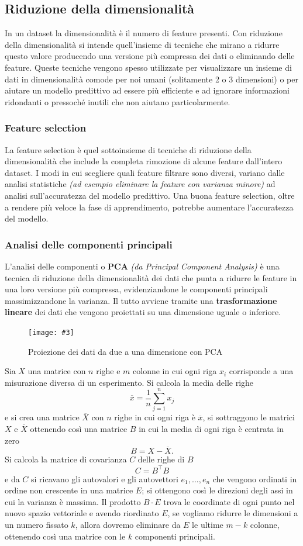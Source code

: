 \documentclass[12pt, twoside, letterpaper]{report}
\newcommand{\img}[4] {
	\begin{figure}
		\centering
		\texttt{[image: \#3]}\\
		\caption{#1}
		\label{#4}
	\end{figure}
}
\begin{document}
			\subsection{Riduzione della dimensionalità} In un dataset la dimensionalità è il numero di feature presenti. Con riduzione della dimensionalità si intende quell'insieme di tecniche che mirano a ridurre questo valore producendo una versione più compressa dei dati o eliminando delle feature. Queste tecniche vengono spesso utilizzate per visualizzare un insieme di dati in dimensionalità comode per noi umani (solitamente 2 o 3 dimensioni) o per aiutare un modello predittivo ad essere più efficiente e ad ignorare informazioni ridondanti o pressoché inutili che non aiutano particolarmente. 
			
				\subsubsection{Feature selection} La feature selection è quel sottoinsieme di tecniche di riduzione della dimensionalità che include la completa rimozione di alcune feature dall'intero dataset. I modi in cui scegliere quali feature filtrare sono diversi, variano dalle analisi statistiche \textit{(ad esempio eliminare la feature con varianza minore)} ad analisi sull'accuratezza del modello predittivo. Una buona feature selection, oltre a rendere più veloce la fase di apprendimento, potrebbe aumentare l'accuratezza del modello.
				
				\subsubsection{Analisi delle componenti principali} L'analisi delle componenti o \textbf{PCA} \textit{(da Principal Component Analysis)} è una tecnica di riduzione della dimensionalità dei dati che punta a ridurre le feature in una loro versione più compressa, evidenziandone le componenti principali massimizzandone la varianza. Il tutto avviene tramite una \textbf{trasformazione lineare} dei dati che vengono proiettati su una dimensione uguale o inferiore.
				\img{Proiezione dei dati da due a una dimensione con PCA \cite{bitsofdna}}{0.3}{pca.jpg}{pca}
				Sia $X$ una matrice con $n$ righe e $m$ colonne in cui ogni riga $x_i$ corrisponde a una misurazione diversa di un esperimento.  Si calcola la media delle righe 
				$$\overline{x}= \frac{1}{n} \sum_{j=1}^n x_j$$ 
				e si crea una matrice $\overline{X}$ con $n$ righe in cui ogni riga è $\overline{x}$, si sottraggono le matrici $X$ e $\overline{X}$ ottenendo così una matrice $B$ in cui la media di ogni riga è centrata in zero
				$$B = X - \overline{X}.$$
					 Si calcola la matrice di covarianza $C$ delle righe di $B$
					 $$C = B^\top B$$
					 e da $C$ si ricavano gli autovalori e gli autovettori $e_1, \dots, e_n$ che vengono ordinati in ordine non crescente in una matrice $E$; si ottengono così le direzioni degli assi in cui la varianza è massima. Il prodotto $B \cdot E$ trova le coordinate di ogni punto nel nuovo spazio vettoriale e avendo riordinato $E$, se vogliamo ridurre le dimensioni a un numero fissato $k$, allora dovremo eliminare da $E$ le ultime $m-k$ colonne, ottenendo così una matrice con le $k$ componenti principali.  	 
				
\end{document}
